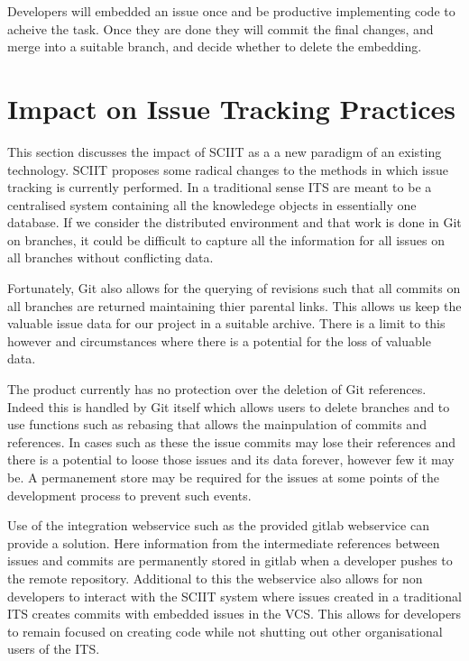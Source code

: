 \documentclass{mproj}
\begin{document}
Developers will embedded an issue once and be productive implementing code to acheive the task. Once they are done they will commit the final changes, and merge into a suitable branch, and decide whether to delete the embedding.


\section{Impact on Issue Tracking Practices}

This section discusses the impact of SCIIT as a a new paradigm of an existing technology. SCIIT proposes some radical changes to the methods in which issue tracking is currently performed. In a traditional sense ITS are meant to be a centralised system containing all the knowledege objects in essentially one database. If we consider the distributed environment and that work is done in Git on branches, it could be difficult to capture all the information for all issues on all branches without conflicting data. 

Fortunately, Git also allows for the querying of revisions such that all commits on all branches are returned maintaining thier parental links. This allows us keep the valuable issue data for our project in a suitable archive. There is a limit to this however and circumstances where there is a potential for the loss of valuable data.

The product currently has no protection over the deletion of Git references. Indeed this is handled by Git itself which allows users to delete branches and to use functions such as rebasing that allows the mainpulation of commits and references. In cases such as these the issue commits may lose their references and there is a potential to loose those issues and its data forever, however few it may be. A permanement store may be required for the issues at some points of the development process to prevent such events.

Use of the integration webservice such as the provided gitlab webservice can provide a solution. Here information from the intermediate references between issues and commits are permanently stored in gitlab when a developer pushes to the remote repository. Additional to this the webservice also allows for non developers to interact with the SCIIT system where issues created in a traditional ITS creates commits with embedded issues in the VCS. This allows for developers to remain focused on creating code while not shutting out other organisational users of the ITS.
\end{document}
